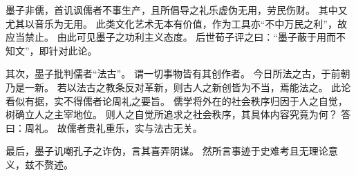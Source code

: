 \documentclass[11pt]{article}
\begin{document}
\newline

墨子非儒，首讥讽儒者不事生产，且所倡导之礼乐虚伪无用，劳民伤财。
其中又尤其以音乐为无用。
此类文化艺术无本有价值，作为工具亦“不中万民之利”，故应当禁止。
由此可见墨子之功利主义态度。
后世荀子评之曰：“墨子蔽于用而不知文”，即针对此论。

\newline

其次，墨子批判儒者“法古”。
谓一切事物皆有其创作者。
今日所法之古，于前朝乃是一新。
若以法古之教条反对革新，则古人之新创皆为不当，焉能法之。
此论看似有据，实不得儒者论周礼之要旨。
儒学将外在的社会秩序归因于人之自觉，树确立人之主宰地位。
则人之自觉所追求之社会秩序，其具体内容究竟为何？
答曰：周礼。
故儒者贵礼重乐，实与法古无关。

\newline

最后，墨子讥嘲孔子之诈伪，言其喜弄阴谋。
然所言事迹于史难考且无理论意义，兹不赘述。
\end{document}
